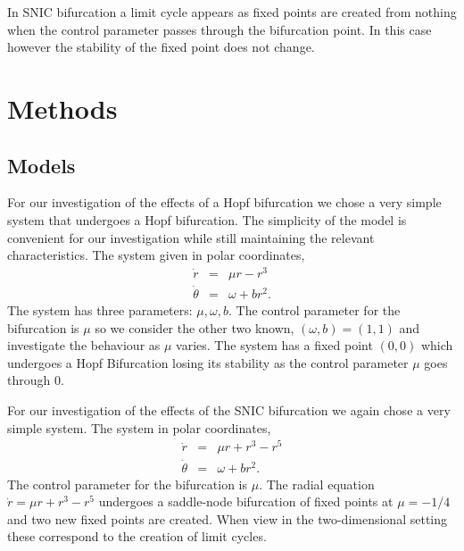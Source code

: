 In SNIC bifurcation a limit cycle appears as  fixed points are created from nothing when the control parameter passes through the bifurcation point. In this case however the stability of the fixed point does not change.

\section{Methods}
\subsection{Models}
For our investigation of the effects of a Hopf bifurcation we chose a very simple system that undergoes a Hopf bifurcation\cite[p.250] {strogatz2001nonlinear}. The simplicity of the model is convenient for our investigation while still maintaining the relevant characteristics. The system given in polar coordinates,
\begin{equation}
\begin{array}{lcl}
\dot r &= & \mu r -r^3 \\
\dot \theta &= & \omega + b r^2.
\end{array}
\end{equation}
The system has three parameters: $\mu, \omega, b$. The control parameter for the bifurcation is $\mu$ so we consider the other two known, $(\omega, b)=(1,1)$ and investigate the behaviour as $\mu$ varies. The system has a fixed point $(0,0)$ which undergoes a Hopf Bifurcation losing its stability as the control parameter $\mu$ goes through $0$.

For our investigation of the effects of the SNIC bifurcation we again chose a very simple system\cite[p.250] {strogatz2001nonlinear}. The system in polar coordinates,
\begin{equation}
\begin{array}{lcl}
\dot r &= & \mu r +r^3 - r^5 \\
\dot \theta &= & \omega + b r^2.
\end{array}
\end{equation}
The control parameter for the bifurcation is $\mu$. The radial equation $\dot r =  \mu r +r^3 - r^5$ undergoes a saddle-node bifurcation of fixed points at $\mu=-1/4$ and two new fixed points are created. When view in the two-dimensional setting these correspond to the creation of limit cycles.
